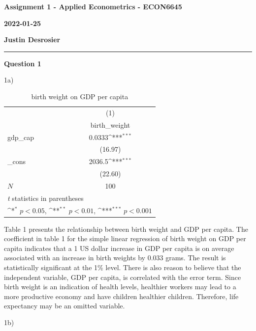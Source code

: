 \documentclass[11pt]{article}
\begin{document}
\textbf{Assignment 1 - Applied Econometrics - ECON6645}

\textbf{2022-01-25}

\textbf{Justin Desrosier}

\noindent\rule{16.51cm}{0.4pt}

\textbf{Question 1}

1a)

{
\begin{table}[ht]
\caption{birth weight on GDP per capita}
\centering
\def\sym#1{\ifmmode^{#1}\else\(^{#1}\)\fi}
\begin{tabular}{l*{1}{c}}
\hline\hline
            &\multicolumn{1}{c}{(1)}\\
            &\multicolumn{1}{c}{birth\_weight}\\
\hline
gdp\_cap     &      0.0333\sym{***}\\
            &     (16.97)         \\
[1em]
\_cons      &      2036.5\sym{***}\\
            &     (22.60)         \\
\hline
\(N\)       &         100         \\
\hline\hline
\multicolumn{2}{l}{\footnotesize \textit{t} statistics in parentheses}\\
\multicolumn{2}{l}{\footnotesize \sym{*} \(p<0.05\), \sym{**} \(p<0.01\), \sym{***} \(p<0.001\)}\\
\end{tabular}
\end{table}
}

Table 1 presents the relationship between birth weight and GDP per capita. The coefficient in table 1 for the simple linear regression of birth weight on GDP per capita indicates that a 1 US dollar increase in GDP per capita is on average associated with an increase in birth weights by 0.033 grams. The result is statistically significant at the 1\% level. There is also reason to believe that the independent variable, GDP per capita, is correlated with the error term. Since birth weight is an indication of health levels, healthier workers may lead to a more productive economy and have children healthier children. Therefore, life expectancy may be an omitted variable.  

1b)
\end{document}
